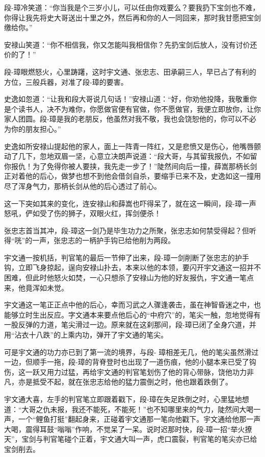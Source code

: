 \documentclass[12pt,oneside]{book}
\begin{document}
段-璋冷笑道：``你当我是个三岁小儿，可以任由你戏要么？要我扔下宝剑也不难，你得让我先将史大哥送出十里之外，然后再和你的人一同回来，那时我甘愿把宝剑缴给你。''

安禄山笑道：``你不相信我，你又怎能叫我相信你？先扔宝剑后放人，没有讨价还价的了！''

段-璋眼燃怒火，心里踌躇，这时宇文通、张忠志、田承嗣三人，早已占了有利的方位，三般兵器，对准了段-璋的要害。

史逸如忽道：``让我和段大哥说几句话！''安禄山道：``好，你劝他投降，我敬重你是个读书人，决不为难你，你愿做官便有官做，你不愿做官，我便立即放你，让你家人团圆。段-璋是我的老朋反，他虽然对我不敬，我也会饶恕他的，你可以不必为你的朋友担心。''

史逸如所安禄山提起他的家人，面上一阵青一阵红，又是悲愤又是伤心，他嘴唇颤动了几下，忽地双眉一坚，心意立决朗声说道：``段大哥，与其留我报仇，不如留你报仇！为了免得你被人要挟，我先走一步了！''陡然间向后一撞，薛嵩那柄长剑正对着他的后心，做梦也想不到他会借剑自杀，要缩手已来不及，史逸如这一撞用尽了浑身气力，那柄长剑从他的后心透过了前心。

这一下突如其来的变化，连安禄山和薛嵩也吓得呆了，就在这一瞬间，段-璋一声怒吼，俨如受了伤的狮子，双眼火红，挥剑便杀！

张忠志首当其冲，段-璋这一剑乃是毕生功力之所聚，张忠志如何禁受得起？但听得``咣''的一声，张忠志的一柄护手钩已给他削为两段。

宇文通一按机括，判官笔的最后一节伸了出来，段-璋一剑削断了张忠志的护手钩，立即飞身掠起，逞向安禄山扑去，本来以他的本领，要闪开宇文通这一招并不困难，但此时他怒火如焚，一心只想杀了安禄山为他的好友报仇，宇文通一笔点来，他竟浑如未觉。

宇文通这一笔正正点中他的后心，幸而习武之人骤逢袭击，虽在神智昏迷之中，也能够立时生出反应。字文通本来要点他后心的``中府穴''的，笔尖一触，忽地觉得有一股反弹的力道，笔尖滑过一边。原来就在这刹那间，段-璋已闭了全身穴道，并用``沾衣十八跌''的上乘内功，弹开了宇文通的笔尖。

可是宇文通的功力亦已到了第一流的境界，与段-
璋相差无几，他的笔尖虽然滑过一边，但顺手一拖，段-璋的背脊登时也出现了一道伤痕，他的小腿本来已受了钩伤，这一跃又用力过猛，再给宇文通的判官笔划伤了他的背心带脉，饶他功力非凡，亦是抵受不起，就在张忠志给他的猛力震倒之时，他也跟着跌倒了。

宇文通大喜，左手的判官笔立即跟着戳下，段-璋在失足跌倒之时，心里猛地想道：``大哥之仇未报，我还不能死，不能死！''也不知哪里来的气力，陡然间大喝一声，一个``鲤鱼打挺''翻起身来，正碰着宇文通那一笔向他戳下。宇文通给他那一声大喝，震得耳鼓``嗡嗡''作响，不觉呆了一呆。说时迟那时快，段-璋一招``举火撩天''，宝剑与判官笔碰个正着，宇文通大叫一声，虎口震裂，判官笔的笔尖亦已给宝剑削去。
\end{document}
